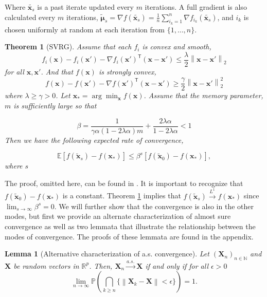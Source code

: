 \documentclass[11pt] {article}
\newcommand{\norm}[1]{\left\lVert#1\right\rVert}
\newcommand{\X}{\pmb{X}}
\newcommand{\x}{\pmb{x}}
\newcommand{\Expectation}{\mathbb{E}}
\newcommand{\convas}{\overset{a.s.}{\longrightarrow}}
\newcommand{\T}{\mathsf{T}}
\newcommand{\naturals}{\mathbb{N}}
\newcommand{\reals}{\mathbb{R}}
\newtheorem{theorem}{Theorem}
\newtheorem{lemma}{Lemma}
\begin{document}
Where $\tilde{\x_s}$ is a past iterate updated every $m$ iterations. A full gradient is also calculated every $m$ iterations, $\tilde{\pmb{\mu}}_s=\nabla f(\tilde{\x_s}) = \frac{1}{n}\sum_{i_k=1}^n \nabla f_{i_k}(\tilde{\x_s})$, and $i_k$ is chosen uniformly at random at each iteration from $\{1, \ldots, n\}$.

\begin{theorem}[SVRG]\label{SVRG}
	Assume that each $f_i$ is convex and smooth,
	\begin{equation*}
	f_i(\x)-f_i(\x') - \nabla f_i(\x')^{\T}(\x-\x') \leq \frac{\lambda}{2}\norm{\x-\x'}_2
	\end{equation*}
	for all $\x, \x'$. And that $f(\x)$ is strongly convex,
	\begin{equation*}
	f(\x) - f(\x') - \nabla f(\x')^{\T}(\x-\x') \geq \frac{\gamma}{2} \norm{\x-\x'}_2^2
	\end{equation*}
	where $\lambda \geq \gamma > 0$. Let $\x_*=\arg\min_{\x} f(\x)$. Assume that the memory parameter, $m$ is sufficiently large so that
	
	\begin{equation*}
	\beta = \frac{1}{\gamma \alpha (1-2\lambda\alpha)m} + \frac{2\lambda\alpha}{1-2\lambda\alpha} <1
	\end{equation*}
	Then we have the following expected rate of convergence,
	
	\begin{equation}\label{SVRGResult}
	\Expectation \left[ f(\tilde{\x}_s) - f(\x_*) \right] \leq \beta^s\left[f(\tilde{\x}_0) - f(\x_*)\right],
	\end{equation}
	where $s$
	
	
\end{theorem}

The proof, omitted here, can be found in \cite{SVRG}. It is important to recognize that $f(\tilde{\x}_0) - f(\x_*)$ is a constant. Theorem \ref{SVRG} implies that $f(\tilde{\x}_s) \overset{L^1}{\longrightarrow} f(\x_*)$ since $\lim_{s\to\infty}\beta^{s}=0$. We will further show that the convergence is also in the other modes, but first we provide an alternate characterization of almost sure convergence as well as two lemmata that illustrate the relationship between the modes of convergence. The proofs of these lemmata are found in the appendix.


\begin{lemma}[Alternative characterization of a.s. convergence]\label{ascharacterization}
	Let $(\X_n)_{n\in \naturals}$ and $\X$ be random vectors in $\reals^p$. Then, $\X_n \convas \X$ if and only if for all $\epsilon >0$
	\begin{equation*}
	\lim_{n\to\infty}\mathbb{P}\left(\bigcap_{k\geq n}\{\norm{\X_k-\X}<\epsilon\}\right) = 1.
	\end{equation*}
\end{lemma}
\end{document}
